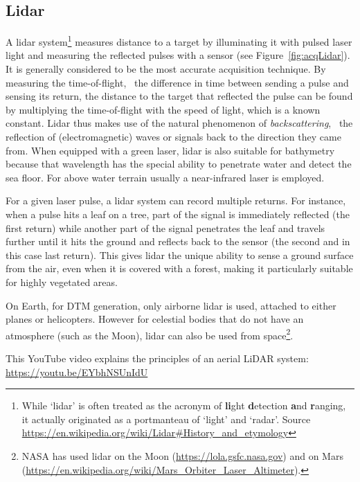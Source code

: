 \subsection{Lidar}
A lidar system\footnote{While `lidar' is often treated as the acronym of \textbf{li}ght \textbf{d}etection \textbf{a}nd \textbf{r}anging, it actually originated as a portmanteau of `light' and `radar'. Source \url{https://en.wikipedia.org/wiki/Lidar\#History\_and\_etymology}} measures distance to a target by illuminating it with pulsed laser light and measuring the reflected pulses with a sensor (see Figure~\ref{fig:acqLidar}). 
It is generally considered to be the most accurate acquisition technique.
By measuring the time-of-flight, \ie\ the difference in time between sending a pulse and sensing its return, the distance to the target that reflected the pulse can be found by multiplying the time-of-flight with the speed of light, which is a known constant.
Lidar thus makes use of the natural phenomenon of \emph{backscattering}, \ie\ the reflection of (electromagnetic) waves or signals back to the direction they came from. 
When equipped with a green laser, lidar is also suitable for bathymetry because that wavelength has the special ability to penetrate water and detect the sea floor. For above water terrain usually a near-infrared laser is employed.

For a given laser pulse, a lidar system can record multiple returns. 
For instance, when a pulse hits a leaf on a tree, part of the signal is immediately reflected (the first return) while another part of the signal penetrates the leaf and travels further until it hits the ground and reflects back to the sensor (the second and in this case last return).  
This gives lidar the unique ability to sense a ground surface from the air, even when it is covered with a forest, making it particularly suitable for highly vegetated areas.

On Earth, for DTM generation, only airborne lidar is used, attached to either planes or helicopters.
However for celestial bodies that do not have an atmosphere (such as the Moon), lidar can also be used from space\footnote{NASA has used lidar on the Moon (\url{https://lola.gsfc.nasa.gov}) and on Mars (\url{https://en.wikipedia.org/wiki/Mars_Orbiter_Laser_Altimeter}).}.

\begin{link-box}
This YouTube video explains the principles of an aerial LiDAR system:
\\
\url{https://youtu.be/EYbhNSUnIdU}
\end{link-box}



